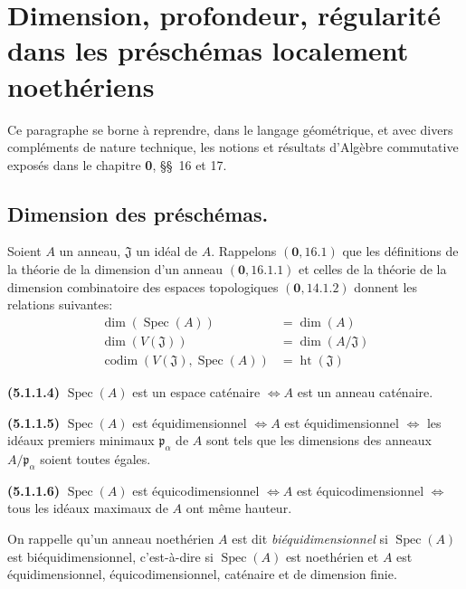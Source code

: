 \section{Dimension, profondeur, régularité dans les préschémas localement
noethériens}

Ce paragraphe se borne à reprendre, dans le langage géométrique, et avec
divers compléments de nature technique, les notions et résultats d'Algèbre
commutative exposés dans le chapitre \textbf{0}, \S\S~16 et 17.

\subsection{Dimension des préschémas.}

\begin{env}[5.1.1]
\label{IV.2.5.1.1-fr}
Soient $A$ un anneau, $\mathfrak J$ un idéal de $A$. Rappelons
$(\mathbf{0},16.1)$ que les définitions de la théorie de la dimension d'un anneau
$(\mathbf{0},16.1.1)$ et celles de la théorie de la dimension combinatoire des espaces
topologiques $(\mathbf{0},14.1.2)$ donnent les relations suivantes:
\begin{align}
\dim(\operatorname{Spec}(A))&=\dim(A)
\tag{5.1.1.1}\label{IV.2.5.1.1.1-fr}\\
\dim(V(\mathfrak J))&=\dim(A/\mathfrak J)
\tag{5.1.1.2}\label{IV.2.5.1.1.2-fr}\\
\operatorname{codim}(V(\mathfrak J),\operatorname{Spec}(A))
&=\operatorname{ht}(\mathfrak J)
\tag{5.1.1.3}\label{IV.2.5.1.1.3-fr}
\end{align}
\par\noindent\textbf{(5.1.1.4)} $\operatorname{Spec}(A)$ est un espace
caténaire $\Longleftrightarrow A$ est un anneau caténaire.
\par\noindent\textbf{(5.1.1.5)} $\operatorname{Spec}(A)$ est
équidimensionnel $\Longleftrightarrow A$ est équidimensionnel
$\Longleftrightarrow$ les idéaux premiers minimaux $\mathfrak p_\alpha$ de
$A$ sont tels que les dimensions des anneaux $A/\mathfrak p_\alpha$ soient
toutes égales.
\par\noindent\textbf{(5.1.1.6)} $\operatorname{Spec}(A)$ est
équicodimensionnel $\Longleftrightarrow A$ est équicodimensionnel
$\Longleftrightarrow$ tous les idéaux maximaux de $A$ ont même hauteur.

On rappelle qu'un anneau noethérien $A$ est dit \emph{biéquidimensionnel} si
$\operatorname{Spec}(A)$ est biéquidimensionnel, c'est-à-dire si
$\operatorname{Spec}(A)$ est noethérien et $A$ est équidimensionnel,
équicodimensionnel, caténaire et de dimension finie.
\end{env}

